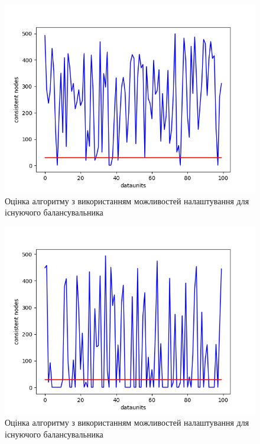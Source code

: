 \documentclass[14pt]{vakthesis}
\begin{document}

\begin{figure}
\centering

\includegraphics[width=\linewidth]{images/own_balancing/w_10_r_500.png}

     \caption{Оцінка алгоритму з використанням можливостей налаштування для існуючого балансувальника}
     \label{fig:own_alg_10}
\end{figure}

\begin{figure}
\centering

\includegraphics[width=\linewidth]{images/own_balancing/w_100_r_500.png}

     \caption{Оцінка алгоритму з використанням можливостей налаштування для існуючого балансувальника}
     \label{fig:own_alg_100}
\end{figure}
\end{document}
